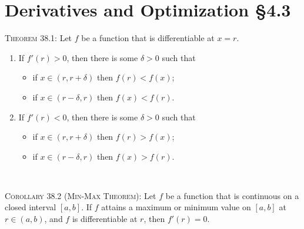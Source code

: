\documentclass[12pt]{amsart}
\begin{document}
	
	
	\thispagestyle{empty}
	
	
	\section*{Derivatives and Optimization \S4.3}
	

\begin{framed} 
 \noindent \textsc{Theorem 38.1:} Let $f$ be a function that is differentiable at $x=r$.
 \begin{enumerate}
 \item 
 If $f'(r) > 0$, then there is some $\delta>0$ such that 
 \begin{itemize}
 \item if $x\in (r,r+\delta)$ then $f(r) < f(x)$;
  \item if $x\in (r-\delta,r)$ then $f(x) < f(r)$.
  \end{itemize}
  
  \item  If $f'(r) < 0$, then there is some $\delta>0$ such that 
  \begin{itemize}
 \item if $x\in (r,r+\delta)$ then $f(r) > f(x)$;
 \item if $x\in (r-\delta,r)$ then $f(x) > f(r)$.
  \end{itemize}
  \end{enumerate}
  
  \
  
  \noindent \textsc{Corollary 38.2 (Min-Max Theorem):}
  Let $f$ be a function that is continuous on a closed interval $[a,b]$. If $f$ attains a maximum or minimum value on $[a,b]$ at $r\in (a,b)$, and $f$ is differentiable at $r$, then $f'(r)=0$.
 \end{framed}


\
\end{document}
